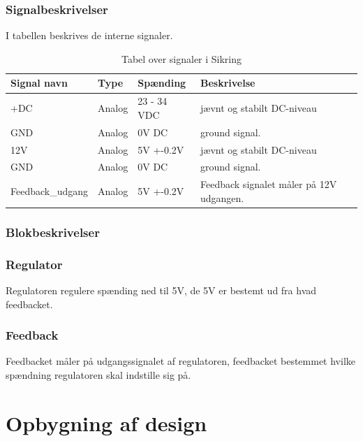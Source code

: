 \subsubsection{Signalbeskrivelser}
I tabellen beskrives de interne signaler.
\begin{table}[H]
\begin{tabular}{|p{3cm}|p{3cm}|p{3cm}|p{4.5cm}|} \hline
\cellcolor[gray]{0.85}Signal navn& \cellcolor[gray]{0.85}Type &\cellcolor[gray]{0.85}Spænding&\cellcolor[gray]{0.85}Beskrivelse\\ \hline
+DC & Analog & 23 - 34 VDC & jævnt og stabilt DC-niveau\\  \hline
GND  & Analog & 0V DC & ground signal. \\  \hline
12V & Analog & 5V +-0.2V & jævnt og stabilt DC-niveau\\ \hline
GND & Analog & 0V DC & ground signal.\\ \hline
Feedback\_udgang & Analog & 5V +-0.2V & Feedback signalet måler på 12V udgangen.\\ \hline
\end{tabular}
\caption{Tabel over signaler i Sikring}
\label{table:udglatning}
\end{table}
\subsubsection{Blokbeskrivelser}
\subsubsection{Regulator}
Regulatoren regulere spænding ned til 5V, de 5V er bestemt ud fra hvad feedbacket. 
\subsubsection{Feedback}
Feedbacket måler på udgangssignalet af regulatoren, feedbacket bestemmet hvilke spændning regulatoren skal indstille sig på.
\newpage
\section{Opbygning af design}

